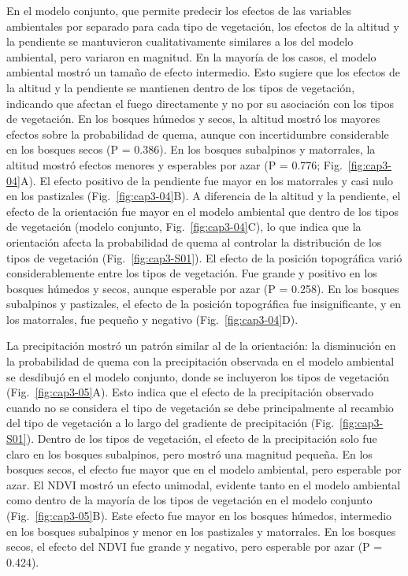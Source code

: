 En el modelo conjunto, que permite predecir los efectos de las variables ambientales por separado para cada tipo de vegetación, los efectos de la altitud y la pendiente se mantuvieron cualitativamente similares a los del modelo ambiental, pero variaron en magnitud. En la mayoría de los casos, el modelo ambiental mostró un tamaño de efecto intermedio. Esto sugiere que los efectos de la altitud y la pendiente se mantienen dentro de los tipos de vegetación, indicando que afectan el fuego directamente y no por su asociación con los tipos de vegetación. En los bosques húmedos y secos, la altitud mostró los mayores efectos sobre la probabilidad de quema, aunque con incertidumbre considerable en los bosques secos (P = 0.386). En los bosques subalpinos y matorrales, la altitud mostró efectos menores y esperables por azar (P = 0.776; Fig.~\ref{fig:cap3-04}A). El efecto positivo de la pendiente fue mayor en los matorrales y casi nulo en los pastizales (Fig.~\ref{fig:cap3-04}B). A diferencia de la altitud y la pendiente, el efecto de la orientación fue mayor en el modelo ambiental que dentro de los tipos de vegetación (modelo conjunto, Fig.~\ref{fig:cap3-04}C), lo que indica que la orientación afecta la probabilidad de quema al controlar la distribución de los tipos de vegetación (Fig.~\ref{fig:cap3-S01}). El efecto de la posición topográfica varió considerablemente entre los tipos de vegetación. Fue grande y positivo en los bosques húmedos y secos, aunque esperable por azar (P = 0.258). En los bosques subalpinos y pastizales, el efecto de la posición topográfica fue insignificante, y en los matorrales, fue pequeño y negativo (Fig.~\ref{fig:cap3-04}D).

La precipitación mostró un patrón similar al de la orientación: la disminución en la probabilidad de quema con la precipitación observada en el modelo ambiental se desdibujó en el modelo conjunto, donde se incluyeron los tipos de vegetación (Fig.~\ref{fig:cap3-05}A). Esto indica que el efecto de la precipitación observado cuando no se considera el tipo de vegetación se debe principalmente al recambio del  tipo de vegetación a lo largo del gradiente de precipitación (Fig.~\ref{fig:cap3-S01}). Dentro de los tipos de vegetación, el efecto de la precipitación solo fue claro en los bosques subalpinos, pero mostró una magnitud pequeña. En los bosques secos, el efecto fue mayor que en el modelo ambiental, pero esperable por azar. El NDVI mostró un efecto unimodal, evidente tanto en el modelo ambiental como dentro de la mayoría de los tipos de vegetación en el modelo conjunto (Fig.~\ref{fig:cap3-05}B). Este efecto fue mayor en los bosques húmedos, intermedio en los bosques subalpinos y menor en los pastizales y matorrales. En los bosques secos, el efecto del NDVI fue grande y negativo, pero esperable por azar (P = 0.424).

